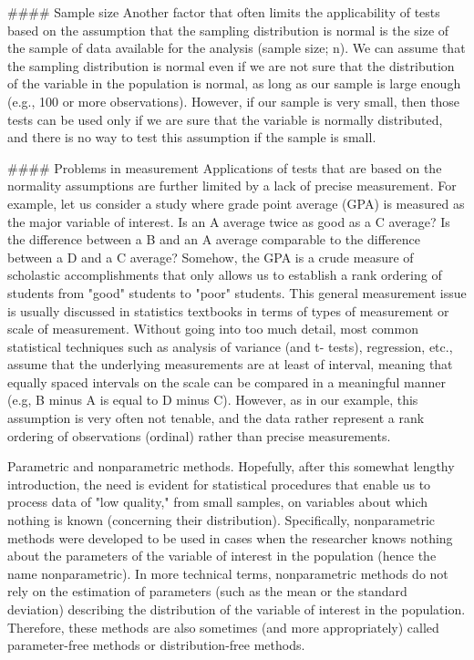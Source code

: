 
#### {Sample size} 
Another factor that often limits the applicability of tests based on the assumption that the sampling distribution is normal is the size of the sample of data available for the analysis (sample size; n). We can assume that the sampling distribution is normal even if we are not sure that the distribution of the variable in the population is normal, as long as our sample is large enough (e.g., 100 or more observations). However, if our sample is very small, then those tests can be used only if we are sure that the variable is normally distributed, and there is no way to test this assumption if the sample is small.

#### {Problems in measurement}
Applications of tests that are based on the normality assumptions are further limited by a lack of precise measurement. For example, let us consider a study where grade point average (GPA) is measured as the major variable of interest. Is an A average twice as good as a C average? Is the difference between a B and an A average comparable to the difference between a D and a C average? Somehow, the GPA is a crude measure of scholastic accomplishments that only allows us to establish a rank ordering of students from "good" students to "poor" students. This general measurement issue is usually discussed in statistics textbooks in terms of types of measurement or scale of measurement. Without going into too much detail, most common statistical techniques such as analysis of variance (and t- tests), regression, etc., assume that the underlying measurements are at least of interval, meaning that equally spaced intervals on the scale can be compared in a meaningful manner (e.g, B minus A is equal to D minus C). However, as in our example, this assumption is very often not tenable, and the data rather represent a rank ordering of observations (ordinal) rather than precise measurements.

Parametric and nonparametric methods. Hopefully, after this somewhat lengthy introduction, the need is evident for statistical procedures that enable us to process data of "low quality," from small samples, on variables about which nothing is known (concerning their distribution). Specifically, nonparametric methods were developed to be used in cases when the researcher knows nothing about the parameters of the variable of interest in the population (hence the name nonparametric). In more technical terms, nonparametric methods do not rely on the estimation of parameters (such as the mean or the standard deviation) describing the distribution of the variable of interest in the population. Therefore, these methods are also sometimes (and more appropriately) called parameter-free methods or distribution-free methods.

